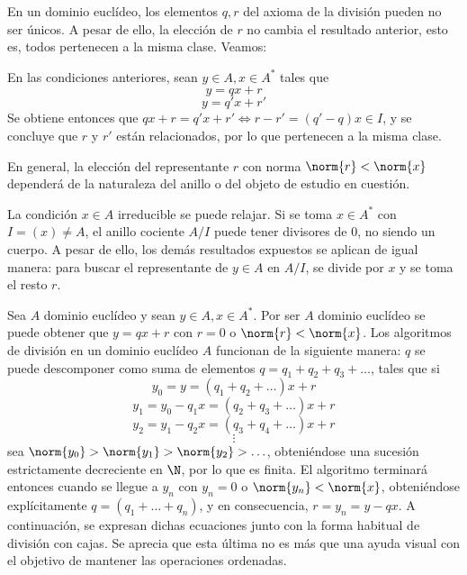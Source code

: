 \begin{TFGampliado}
\begin{obss}
    \item En un dominio euclídeo, los elementos $q,r$ del axioma de la división pueden no ser únicos. A pesar de ello, la elección de $r$ no cambia el resultado anterior, esto es, todos pertenecen a la misma clase. Veamos:
    
    En las condiciones anteriores, sean $y\in A, x\in A^*$ tales que \[y = qx + r\]\[y = q'x + r'\] Se obtiene entonces que $ qx + r = q'x + r' \iff r - r' = (q'-q)x \in I $, y se concluye que $r$ y $r'$ están relacionados, por lo que pertenecen a la misma clase.
    
    En general, la elección del representante $r$ con norma $\norm{r} < \norm{x}$ dependerá de la naturaleza del anillo o del objeto de estudio en cuestión.
    \item La condición $x\in A$ irreducible se puede relajar. Si se toma $x\in A^*$ con $I =(x) \neq A$, el anillo cociente $A/I$ puede tener divisores de 0, no siendo un cuerpo. A pesar de ello, los demás resultados expuestos se aplican de igual manera: para buscar el representante de $y\in A$ en $A/I$, se divide por $x$ y se toma el resto $r$.
\end{obss}
    \begin{prop}
    \item Sea $A$ dominio euclídeo y sean $y\in A, x\in A^*$. Por ser $A$ dominio euclídeo se puede obtener que $y = qx + r$ con $r = 0$ o $\norm{r} < \norm{x}$. Los algoritmos de división en un dominio euclídeo $A$ funcionan de la siguiente manera: $q$ se puede descomponer como suma de elementos $q = q_1 + q_2 + q_3 +\ldots$, tales que si
    \[y_0 = y = (q_1 + q_2 + \ldots)x + r \]
    \[y_1 = y_0-q_1x = (q_2 + q_3 +\ldots)x + r\] 
    \[y_2 = y_1-q_2x = (q_3 + q_4 + \ldots)x + r\]
    \[\vdots\]
    sea $\norm{y_0} > \norm{y_1} > \norm{y_2} > \ldots$, obteniéndose una sucesión estrictamente decreciente en $\N$, por lo que es finita. El algoritmo terminará entonces cuando se llegue a $y_n$ con $y_n = 0$ o $\norm{y_n} <\norm{x}$, obteniéndose explícitamente $q = (q_1 + \ldots + q_n)$, y en consecuencia, $r = y_n = y - qx$. A continuación, se expresan dichas ecuaciones junto con la forma habitual de división con cajas. Se aprecia que esta última no es más que una ayuda visual con el objetivo de mantener las operaciones ordenadas.
        

\end{prop}
\end{TFGampliado}
